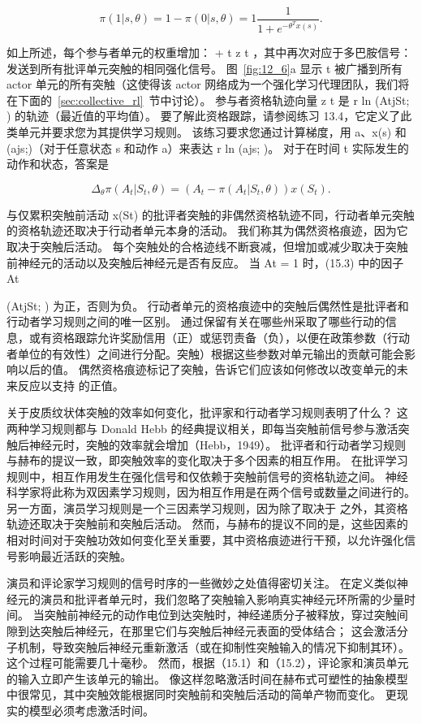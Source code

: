 {\begin{equation}
	\pi (1|s, \theta) = 
		1 - \pi(0|s, \theta) 
		= 1 \frac{1}{1 + e^{-\theta^T x(s)}}.
\end{equation}


如上所述，每个参与者单元的权重增加： + t z t ，其中再次对应于多巴胺信号：发送到所有批评单元突触的相同强化信号。
图~\ref{fig:12_6}a 显示 t 被广播到所有 actor 单元的所有突触（这使得该 actor 网络成为一个强化学习代理团队，我们将在下面的~\ref{sec:collective_rl}~节中讨论）。
参与者资格轨迹向量 z t 是 r ln (AtjSt; ) 的轨迹（最近值的平均值）。
要了解此资格跟踪，请参阅练习 13.4，它定义了此类单元并要求您为其提供学习规则。
该练习要求您通过计算梯度，用 a、x(s) 和 (ajs;)（对于任意状态 s 和动作 a）来表达 r ln (ajs; )。
对于在时间 t 实际发生的动作和状态，答案是

\begin{equation}
	\Delta_{\theta} \pi (A_t | S_t, \theta)
		= (A_t - \pi(A_t|S_t, \theta)) x(S_t).
\end{equation}


与仅累积突触前活动 x(St) 的批评者突触的非偶然资格轨迹不同，行动者单元突触的资格轨迹还取决于行动者单元本身的活动。
我们称其为偶然资格痕迹，因为它取决于突触后活动。
每个突触处的合格迹线不断衰减，但增加或减少取决于突触前神经元的活动以及突触后神经元是否有反应。
当 At = 1 时，(15.3) 中的因子 At } (AtjSt; ) 为正，否则为负。
行动者单元的资格痕迹中的突触后偶然性是批评者和行动者学习规则之间的唯一区别。
通过保留有关在哪些州采取了哪些行动的信息，或有资格跟踪允许奖励信用（正）或惩罚责备（负），以便在政策参数（行动者单位的有效性）之间进行分配。突触）根据这些参数对单元输出的贡献可能会影响以后的值。
偶然资格痕迹标记了突触，告诉它们应该如何修改以改变单元的未来反应以支持 的正值。


关于皮质纹状体突触的效率如何变化，批评家和行动者学习规则表明了什么？
这两种学习规则都与 Donald Hebb 的经典提议相关，即每当突触前信号参与激活突触后神经元时，突触的效率就会增加（Hebb，1949）。
批评者和行动者学习规则与赫布的提议一致，即突触效率的变化取决于多个因素的相互作用。
在批评学习规则中，相互作用发生在强化信号和仅依赖于突触前信号的资格轨迹之间。
神经科学家将此称为双因素学习规则，因为相互作用是在两个信号或数量之间进行的。
另一方面，演员学习规则是一个三因素学习规则，因为除了取决于 之外，其资格轨迹还取决于突触前和突触后活动。
然而，与赫布的提议不同的是，这些因素的相对时间对于突触功效如何变化至关重要，其中资格痕迹进行干预，以允许强化信号影响最近活跃的突触。


演员和评论家学习规则的信号时序的一些微妙之处值得密切关注。
在定义类似神经元的演员和批评者单元时，我们忽略了突触输入影响真实神经元环所需的少量时间。
当突触前神经元的动作电位到达突触时，神经递质分子被释放，穿过突触间隙到达突触后神经元，在那里它们与突触后神经元表面的受体结合；
这会激活分子机制，导致突触后神经元重新激活（或在抑制性突触输入的情况下抑制其环）。
这个过程可能需要几十毫秒。
然而，根据（15.1）和（15.2），评论家和演员单元的输入立即产生该单元的输出。
像这样忽略激活时间在赫布式可塑性的抽象模型中很常见，其中突触效能根据同时突触前和突触后活动的简单产物而变化。
更现实的模型必须考虑激活时间。


